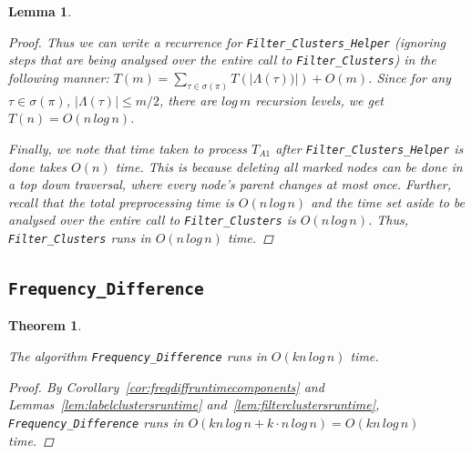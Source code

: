 \documentclass{article}
\newcommand{\leafset}{\Lambda}
\newtheorem{filterclustersruntime}[incompatibility]{Lemma}
\newtheorem{freqdiffruntime}[incompatibility]{Theorem}
\begin{document}
\begin{filterclustersruntime}
\begin{proof}
            Thus we can write a recurrence for \texttt{Filter\_Clusters\_Helper} (ignoring steps that are being analysed over the entire call to \texttt{Filter\_Clusters}) in the following manner: $T(m) = \sum_{\tau \in \sigma(\pi)}T(|\leafset(\tau))|) + O(m)$. Since for any $\tau \in \sigma(\pi)$, $|\leafset(\tau)| \leq m/2$, there are $log\,m$ recursion levels, we get $T(n) = O(n\,log\,n)$.

            Finally, we note that time taken to process $T_{A1}$ after \texttt{Filter\_Clusters\_Helper} is done takes $O(n)$ time. This is because deleting all marked nodes can be done in a top down traversal, where every node's parent changes at most once. Further, recall that the total preprocessing time is $O(n\,log\,n)$ and the time set aside to be analysed over the entire call to \texttt{Filter\_Clusters} is $O(n\,log\,n)$. Thus, \texttt{Filter\_Clusters} runs in $O(n\,log\,n)$ time.
        \end{proof}
    \end{filterclustersruntime}

    \subsection{\texttt{Frequency\_Difference}}

    \begin{freqdiffruntime}
        \label{theorem:freqdiffruntime}

        The algorithm \texttt{Frequency\_Difference} runs in $O(kn\,log\,n)$ time.

        \begin{proof}
            By Corollary~\ref{cor:freqdiffruntimecomponents} and Lemmas~\ref{lem:labelclustersruntime} and~\ref{lem:filterclustersruntime}, \texttt{Frequency\_Difference} runs in $O(kn\,log\,n + k \cdot n\,log\,n) = O(kn\,log\,n)$ time.
        \end{proof}
    \end{freqdiffruntime}

    \newpage
    
    
\end{document}
